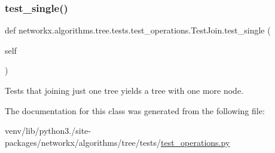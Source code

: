 \subsubsection{\texorpdfstring{test\+\_\+single()}{test\_single()}}
{\footnotesize\ttfamily def networkx.\+algorithms.\+tree.\+tests.\+test\+\_\+operations.\+Test\+Join.\+test\+\_\+single (\begin{DoxyParamCaption}\item[{}]{self }\end{DoxyParamCaption})}

\begin{DoxyVerb}Tests that joining just one tree yields a tree with one more
node.\end{DoxyVerb}
 

The documentation for this class was generated from the following file\+:\begin{DoxyCompactItemize}
\item 
venv/lib/python3./site-\/packages/networkx/algorithms/tree/tests/\hyperlink{test__operations_8py}{test\+\_\+operations.\+py}\end{DoxyCompactItemize}

